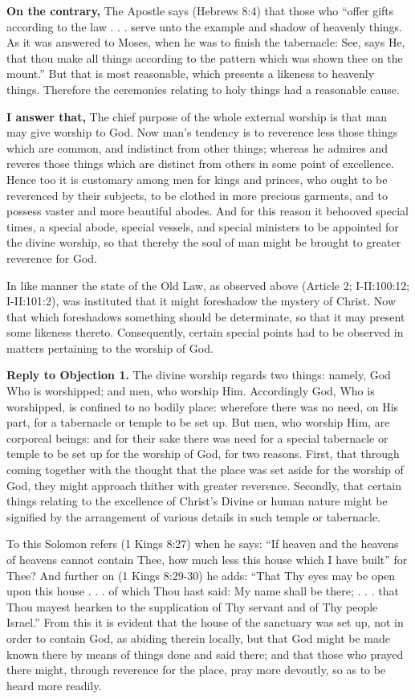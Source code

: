 \textbf{On the contrary,} The Apostle says (Hebrews 8:4) that those who ``offer gifts according to the law . . . serve unto the example and shadow of heavenly things. As it was answered to Moses, when he was to finish the tabernacle: See, says He, that thou make all things according to the pattern which was shown thee on the mount.'' But that is most reasonable, which presents a likeness to heavenly things. Therefore the ceremonies relating to holy things had a reasonable cause.

\textbf{I answer that,} The chief purpose of the whole external worship is that man may give worship to God. Now man's tendency is to reverence less those things which are common, and indistinct from other things; whereas he admires and reveres those things which are distinct from others in some point of excellence. Hence too it is customary among men for kings and princes, who ought to be reverenced by their subjects, to be clothed in more precious garments, and to possess vaster and more beautiful abodes. And for this reason it behooved special times, a special abode, special vessels, and special ministers to be appointed for the divine worship, so that thereby the soul of man might be brought to greater reverence for God.

In like manner the state of the Old Law, as observed above (Article 2; I-II:100:12; I-II:101:2), was instituted that it might foreshadow the mystery of Christ. Now that which foreshadows something should be determinate, so that it may present some likeness thereto. Consequently, certain special points had to be observed in matters pertaining to the worship of God.

\textbf{Reply to Objection 1.} The divine worship regards two things: namely, God Who is worshipped; and men, who worship Him. Accordingly God, Who is worshipped, is confined to no bodily place: wherefore there was no need, on His part, for a tabernacle or temple to be set up. But men, who worship Him, are corporeal beings: and for their sake there was need for a special tabernacle or temple to be set up for the worship of God, for two reasons. First, that through coming together with the thought that the place was set aside for the worship of God, they might approach thither with greater reverence. Secondly, that certain things relating to the excellence of Christ's Divine or human nature might be signified by the arrangement of various details in such temple or tabernacle.

To this Solomon refers (1 Kings 8:27) when he says: ``If heaven and the heavens of heavens cannot contain Thee, how much less this house which I have built'' for Thee? And further on (1 Kings 8:29-30) he adds: ``That Thy eyes may be open upon this house . . . of which Thou hast said: My name shall be there; . . . that Thou mayest hearken to the supplication of Thy servant and of Thy people Israel.'' From this it is evident that the house of the sanctuary was set up, not in order to contain God, as abiding therein locally, but that God might be made known there by means of things done and said there; and that those who prayed there might, through reverence for the place, pray more devoutly, so as to be heard more readily.

